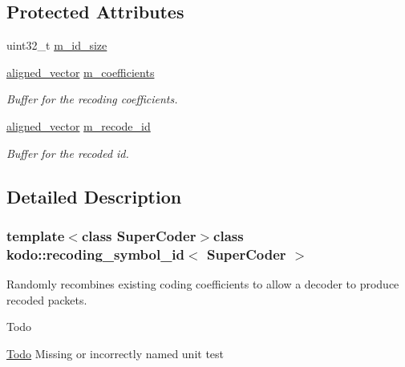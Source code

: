 \subsection*{Protected Attributes}
\begin{DoxyCompactItemize}
\item 
uint32\-\_\-t \hyperlink{classkodo_1_1recoding__symbol__id_a8cd892afcd6cb06da3ed1b892e78f342}{m\-\_\-id\-\_\-size}
\item 
\hypertarget{classkodo_1_1recoding__symbol__id_a9545df74c9920c0751e8b97535cce584}{\hyperlink{classkodo_1_1recoding__symbol__id_a12f113fed76cfaf960e79504c4c2f93c}{aligned\-\_\-vector} \hyperlink{classkodo_1_1recoding__symbol__id_a9545df74c9920c0751e8b97535cce584}{m\-\_\-coefficients}}\label{classkodo_1_1recoding__symbol__id_a9545df74c9920c0751e8b97535cce584}

\begin{DoxyCompactList}\small\item\em Buffer for the recoding coefficients. \end{DoxyCompactList}\item 
\hypertarget{classkodo_1_1recoding__symbol__id_a35e1197ecd1817069f28ef92160f6ad2}{\hyperlink{classkodo_1_1recoding__symbol__id_a12f113fed76cfaf960e79504c4c2f93c}{aligned\-\_\-vector} \hyperlink{classkodo_1_1recoding__symbol__id_a35e1197ecd1817069f28ef92160f6ad2}{m\-\_\-recode\-\_\-id}}\label{classkodo_1_1recoding__symbol__id_a35e1197ecd1817069f28ef92160f6ad2}

\begin{DoxyCompactList}\small\item\em Buffer for the recoded id. \end{DoxyCompactList}\end{DoxyCompactItemize}


\subsection{Detailed Description}
\subsubsection*{template$<$class Super\-Coder$>$class kodo\-::recoding\-\_\-symbol\-\_\-id$<$ Super\-Coder $>$}

Randomly recombines existing coding coefficients to allow a decoder to produce recoded packets. 

\begin{DoxyRefDesc}{Todo}
\item[\hyperlink{todo__todo000043}{Todo}]Missing or incorrectly named unit test\end{DoxyRefDesc}


